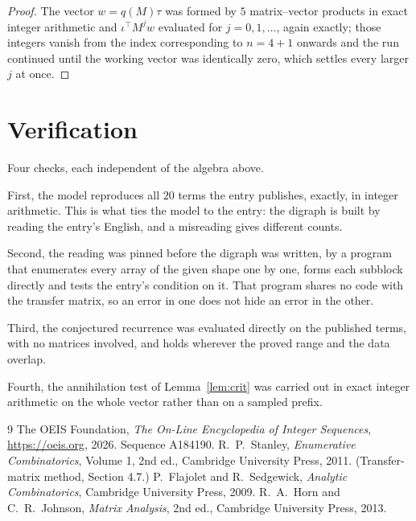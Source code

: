 \documentclass[11pt,a4paper]{article}
\theoremstyle{plain}
\theoremstyle{definition}
\begin{document}
\begin{proof}
The vector $w=q(M)\tau$ was formed by $5$ matrix--vector products in exact integer
arithmetic and $\iota^{\!\top}M^{j}w$ evaluated for $j=0,1,\dots$, again exactly; those
integers vanish from the index corresponding to $n=4+1$ onwards and the run continued
until the working vector was identically zero, which settles every larger $j$ at once.
\end{proof}

\section{Verification}

Four checks, each independent of the algebra above.

First, the model reproduces all $20$ terms the entry publishes, exactly, in integer
arithmetic. This is what ties the model to the entry: the digraph is built by reading the
entry's English, and a misreading gives different counts.

Second, the reading was pinned before the digraph was written, by a program that enumerates
every array of the given shape one by one, forms each subblock directly and tests the entry's
condition on it. That program shares no code with the transfer matrix, so an error in one does
not hide an error in the other.

Third, the conjectured recurrence was evaluated directly on the published terms, with no
matrices involved, and holds wherever the proved range and the data overlap.

Fourth, the annihilation test of Lemma~\ref{lem:crit} was carried out in exact integer
arithmetic on the whole vector rather than on a sampled prefix.

\begin{thebibliography}{9}
 The OEIS Foundation, \emph{The On-Line Encyclopedia of Integer
Sequences}, \url{https://oeis.org}, 2026. Sequence A184190.
 R.~P.~Stanley, \emph{Enumerative Combinatorics}, Volume 1, 2nd ed.,
Cambridge University Press, 2011. (Transfer-matrix method, Section 4.7.)
 P.~Flajolet and R.~Sedgewick, \emph{Analytic Combinatorics}, Cambridge
University Press, 2009.
 R.~A.~Horn and C.~R.~Johnson, \emph{Matrix Analysis}, 2nd ed., Cambridge
University Press, 2013.
\end{thebibliography}
\end{document}
